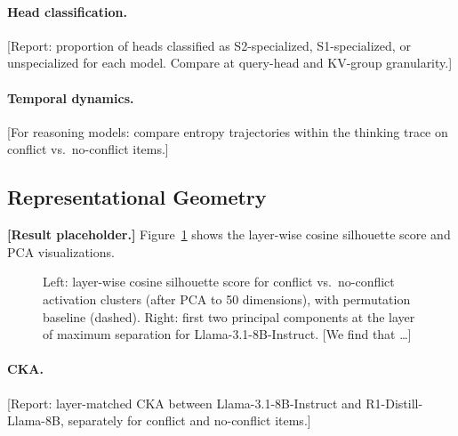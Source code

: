 \paragraph{Head classification.}  [Report: proportion of heads classified as
S2-specialized, S1-specialized, or unspecialized for each model.  Compare
at query-head and KV-group granularity.]

\paragraph{Temporal dynamics.}  [For reasoning models: compare entropy
trajectories within the thinking trace on conflict vs.\ no-conflict items.]

\subsection{Representational Geometry}
\label{sec:results_geometry}

\textbf{[Result placeholder.]}  Figure~\ref{fig:geometry} shows the
layer-wise cosine silhouette score and PCA visualizations.

\begin{figure}[t]
\centering
\caption{Left: layer-wise cosine silhouette score for conflict vs.\
  no-conflict activation clusters (after PCA to 50 dimensions), with
  permutation baseline (dashed).  Right: first two principal components
  at the layer of maximum separation for Llama-3.1-8B-Instruct.  [We find
  that \ldots]}
\label{fig:geometry}
\end{figure}

\paragraph{CKA.}  [Report: layer-matched CKA between Llama-3.1-8B-Instruct
and R1-Distill-Llama-8B, separately for conflict and no-conflict items.]

